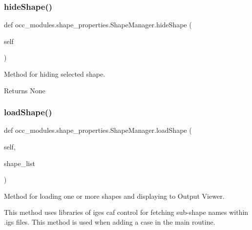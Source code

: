 \subsubsection{\texorpdfstring{hide\+Shape()}{hideShape()}}
{\footnotesize\ttfamily def occ\+\_\+modules.\+shape\+\_\+properties.\+Shape\+Manager.\+hide\+Shape (\begin{DoxyParamCaption}\item[{}]{self }\end{DoxyParamCaption})}



Method for hiding selected shape. 

\begin{DoxyReturn}{Returns}
None 
\end{DoxyReturn}
\hypertarget{a00095_a8833b4dba535cb76318777c031cf08b5}{}\label{a00095_a8833b4dba535cb76318777c031cf08b5} 
\subsubsection{\texorpdfstring{load\+Shape()}{loadShape()}}
{\footnotesize\ttfamily def occ\+\_\+modules.\+shape\+\_\+properties.\+Shape\+Manager.\+load\+Shape (\begin{DoxyParamCaption}\item[{}]{self,  }\item[{}]{shape\+\_\+list }\end{DoxyParamCaption})}



Method for loading one or more shapes and displaying to Output Viewer. 

This method uses libraries of iges caf control for fetching sub-\/shape names within .igs files. This method is used when adding a case in the main routine.


